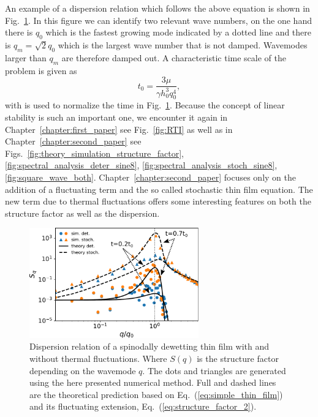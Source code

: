 An example of a dispersion relation which follows the above equation is shown in Fig.~\ref{fig:dispertion_1}.
In this figure we can identify two relevant wave numbers, on the one hand there is $q_0$ which is the fastest growing mode indicated by a dotted line and there is $q_m = \sqrt{2}q_0$ which is the largest wave number that is not damped.
Wavemodes larger than $q_m$ are therefore damped out.
A characteristic time scale of the problem is given as
\begin{equation}
    t_0 = \frac{3\mu}{\gamma h_0^3 q_0^4},
\end{equation}
with is used to normalize the time in Fig.~\ref{fig:dispertion_1}.
Because the concept of linear stability is such an important one, we encounter it again in Chapter~\ref{chapter:first_paper} see Fig.~\ref{fig:RTI} as well as in Chapter~\ref{chapter:second_paper} see Figs.~\ref{fig:theory_simulation_structure_factor}, \ref{fig:spectral_analysis_deter_sine8}, \ref{fig:spectral_analysis_stoch_sine8}, \ref{fig:square_wave_both}.
Chapter~\ref{chapter:second_paper} focuses only on the addition of a fluctuating term and the so called stochastic thin film equation.
The new term due to thermal fluctuations offers some interesting features on both the structure factor as well as the dispersion.

\begin{figure}
    \centering
    \includegraphics[width=0.65\textwidth]{graphics/spectratheta20.pdf}
    \caption{Dispersion relation of a spinodally dewetting thin film with and without thermal fluctuations.
    Where $S(q)$ is the structure factor depending on the wavemode $q$.
    The dots and triangles are generated using the here presented numerical method. 
    Full and dashed lines are the theoretical prediction based on Eq.~(\ref{eq:simple_thin_film}) and its fluctuating extension, Eq.~(\ref{eq:structure_factor_2}).
    }
    \label{fig:dispertion_1}
\end{figure}

